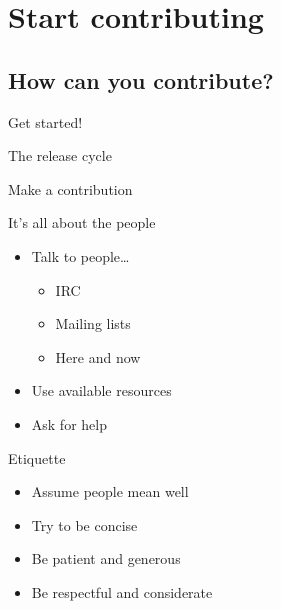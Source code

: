 \documentclass{beamer}
\begin{document}
\section{Start contributing}

\subsection{How can you contribute?}

\begin{frame}{Get started!}
\end{frame}

\begin{frame}{The release cycle}
\end{frame}

\begin{frame}{Make a contribution}
\end{frame}

\begin{frame}{It's all about the people}
  \begin{itemize}
  \item
    Talk to people\ldots
    \begin{itemize}
    \item
      IRC
    \item
      Mailing lists
    \item
      Here and now
    \end{itemize}
  \item
    Use available resources
  \item
    Ask for help
  \end{itemize}
\end{frame}

\begin{frame}{Etiquette}
  \begin{itemize}
  \item
    Assume people mean well
  \item
    Try to be concise
  \item
    Be patient and generous
  \item
    Be respectful and considerate
  \end{itemize}
\end{frame}
\end{document}
